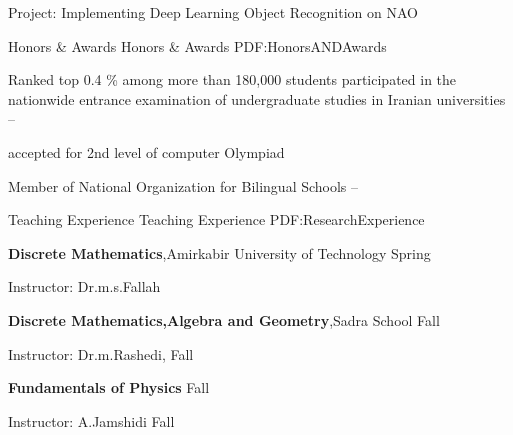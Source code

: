 \documentclass[letterpaper,MMMyyyy,nonstopmode]{simpleresumecv}
\begin{document}
\begin{Body}
\begin{Detail}
\SubBulletItem
Project: Implementing Deep Learning Object Recognition on NAO



\end{Detail}


\Gap




\Section
{Honors \&\newline
Awards}
{Honors \& Awards}
{PDF:HonorsANDAwards}

\BulletItem
Ranked top 0.4 \% among more than 180,000 students participated
in the nationwide entrance examination of undergraduate studies
in Iranian universities  
\hfill
{} --

\BulletItem
 accepted for 2nd level of computer Olympiad 
\hfill
{}


\BulletItem
 Member of National Organization for Bilingual Schools
\hfill
{} --





\Section
{Teaching Experience}
{Teaching Experience}
{PDF:ResearchExperience}

\Entry
\textbf{Discrete Mathematics},Amirkabir University of Technology
\hfill
Spring 

\BulletItem
Instructor: Dr.m.s.Fallah


\Entry
\textbf{Discrete Mathematics,Algebra and Geometry},Sadra School
\hfill
Fall 

\BulletItem
Instructor: Dr.m.Rashedi,
Fall 


\Entry
\textbf{Fundamentals of Physics}
\hfill
Fall 

\BulletItem
Instructor: A.Jamshidi
Fall 








\end{Body}
\end{document}
